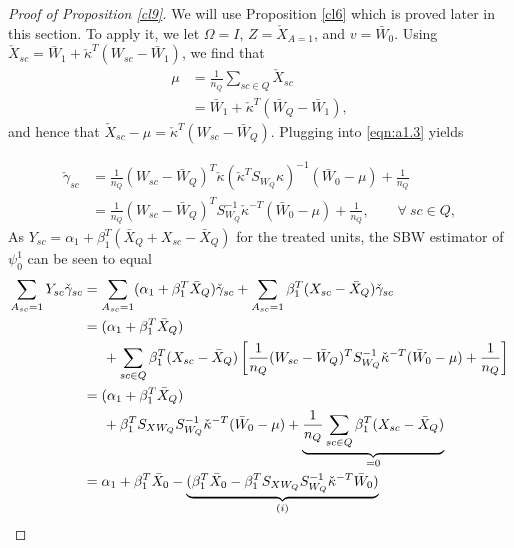 \begin{proof}[Proof of Proposition \ref{cl9}]

We will use Proposition \ref{cl6} which is proved later in this section. To apply it, we let $\Omega = I$, $Z = \check{X}_{A=1}$, and $v = \bar{W}_0$. Using  $\check{X}_{sc} = \bar{W}_1 + \check{\kappa}^T(W_{sc} - \bar{W}_1)$, we find that 
\begin{align}
    \nonumber \mu & = \frac{1}{n_Q} \sum_{sc \in Q} \check{X}_{sc} \\
    \label{eqn:cl9.mu} & = \bar{W}_1 + \check{\kappa}^T(\bar{W}_Q - \bar{W}_1),
\end{align}
and hence that $\check{X}_{sc} - \mu = \check{\kappa}^T(W_{sc} - \bar{W}_Q)$. Plugging into \eqref{eqn:a1.3} yields 

\begin{align}
 \nonumber \check{\gamma}_{sc} & = \frac{1}{n_Q}(W_{sc} - \bar{W}_Q)^T \check{\kappa} (\check{\kappa}^T S_{W_Q} \kappa)^{-1}(\bar{W}_0 - \mu) + \frac{1}{n_Q} \\
 \label{eqn:cl9.proof.gamma}& = \frac{1}{n_Q}(W_{sc} - \bar{W}_Q)^T S_{W_Q}^{-1} \check{\kappa}^{-T}(\bar{W}_0 - \mu) + \frac{1}{n_Q}, \qquad \forall \ sc \in Q,
\end{align}
As $Y_{sc} = \alpha_1 + \beta_1^T (\bar{X}_Q + X_{sc} - \bar{X}_Q)$ for the treated units, the SBW estimator of $\psi_0^1$ can be seen to equal
\begin{align}
    \nonumber \sum_{A_{sc}=1} Y_{sc}\check{\gamma}_{sc} & = \sum_{A_{sc}=1} (\alpha_1 + \beta_1^T \bar{X}_Q) \check{\gamma}_{sc} + \sum_{A_{sc}=1}  \beta_1^T (X_{sc} - \bar{X}_Q)\check{\gamma}_{sc} \\
 \label{eqn:cl9.proof1}    & = (\alpha_1 + \beta_1^T \bar{X}_Q)\\
    \nonumber & \hskip.5cm {} + \sum_{sc \in Q}  \beta_1^T(X_{sc} - \bar{X}_Q)\left[\frac{1}{n_Q} (W_{sc} - \bar{W}_Q)^T S_{W_Q}^{-1} \check{\kappa}^{-T}(\bar{W}_0 - \mu) +  \frac{1}{n_Q}\right] \\
\label{eqn:cl9.proof2}    & = (\alpha_1 + \beta_1^T \bar{X}_Q)\\
    \nonumber & \hskip.5cm {} +  \beta_1^TS_{XW_Q} S_{W_Q}^{-1} \check{\kappa}^{-T}(\bar{W}_0 - \mu) + \underbrace{\frac{1}{n_Q}\sum_{sc \in Q}   \beta_1^T (X_{sc} - \bar{X}_Q) }_{= 0} \\ %
\label{eqn:cl9.proof3}    & = \alpha_1 + \beta_1^T \bar{X}_0 - \underbrace{(\beta_1^T \bar{X}_0 -  \beta_1^TS_{XW_Q} S_{W_Q}^{-1} \check{\kappa}^{-T}\bar{W}_0)}_{(i)} \\

\end{align}
\end{proof}
